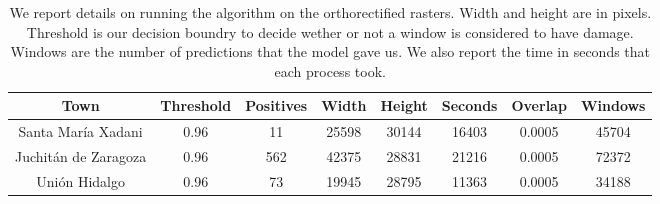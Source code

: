 \begin{table}[h!]
  \centering
  \begin{tabular}{|c|c|c|c|c|c|c|c|}
    \hline
    Town                 &Threshold&Positives  & Width & Height & Seconds & Overlap &Windows \\ \hline
    Santa Mar\'ia Xadani   &0.96      &11         & 25598 & 30144  & 16403   & 0.0005  &45704 \\ \hline
    Juchit\'an de Zaragoza &0.96      &562        & 42375 & 28831  & 21216   & 0.0005  &72372 \\ \hline
    Uni\'on Hidalgo        &0.96      &73         & 19945 & 28795  & 11363   & 0.0005  &34188 \\
    \hline
  \end{tabular}
  \caption{We report details on running the algorithm on the orthorectified rasters. Width and height are in pixels. Threshold is our decision boundry to decide wether or not a window is considered to have damage. Windows are the number of predictions that the model gave us. We also report the time in seconds that each process took.}
  \label{table:results}
\end{table}




